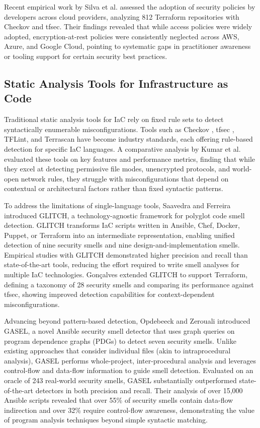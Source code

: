 Recent empirical work by Silva et al. \cite{Silva24} assessed the adoption of security policies by developers across cloud providers, analyzing 812 Terraform repositories with Checkov and tfsec. Their findings revealed that while access policies were widely adopted, encryption-at-rest policies were consistently neglected across AWS, Azure, and Google Cloud, pointing to systematic gaps in practitioner awareness or tooling support for certain security best practices.

\subsection{Static Analysis Tools for Infrastructure as Code}

Traditional static analysis tools for IaC rely on fixed rule sets to detect syntactically enumerable misconfigurations. Tools such as Checkov \cite{Checkov}, tfsec \cite{Tfsec}, TFLint, and Terrascan have become industry standards, each offering rule-based detection for specific IaC languages. A comparative analysis by Kumar et al. \cite{Kumar24} evaluated these tools on key features and performance metrics, finding that while they excel at detecting permissive file modes, unencrypted protocols, and world-open network rules, they struggle with misconfigurations that depend on contextual or architectural factors rather than fixed syntactic patterns.

To address the limitations of single-language tools, Saavedra and Ferreira \cite{Saavedra23} introduced GLITCH, a technology-agnostic framework for polyglot code smell detection. GLITCH transforms IaC scripts written in Ansible, Chef, Docker, Puppet, or Terraform into an intermediate representation, enabling unified detection of nine security smells and nine design-and-implementation smells. Empirical studies with GLITCH demonstrated higher precision and recall than state-of-the-art tools, reducing the effort required to write smell analyses for multiple IaC technologies. Gonçalves \cite{Goncalves23} extended GLITCH to support Terraform, defining a taxonomy of 28 security smells and comparing its performance against tfsec, showing improved detection capabilities for context-dependent misconfigurations.

Advancing beyond pattern-based detection, Opdebeeck and Zerouali \cite{Opdebeeck23} introduced GASEL, a novel Ansible security smell detector that uses graph queries on program dependence graphs (PDGs) to detect seven security smells. Unlike existing approaches that consider individual files (akin to intraprocedural analysis), GASEL performs whole-project, inter-procedural analysis and leverages control-flow and data-flow information to guide smell detection. Evaluated on an oracle of 243 real-world security smells, GASEL substantially outperformed state-of-the-art detectors in both precision and recall. Their analysis of over 15,000 Ansible scripts revealed that over 55\% of security smells contain data-flow indirection and over 32\% require control-flow awareness, demonstrating the value of program analysis techniques beyond simple syntactic matching.

